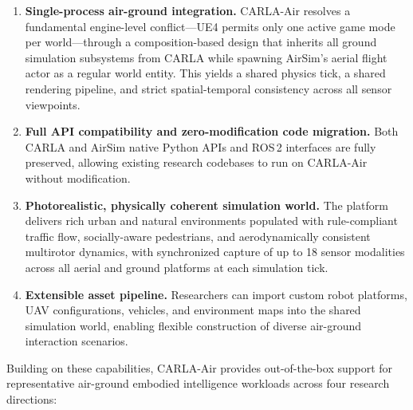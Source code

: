 \begin{enumerate}[leftmargin=*, label=(\roman*)]

\item \textbf{Single-process air-ground integration.}
CARLA-Air resolves a fundamental engine-level conflict---UE4 permits only one
active game mode per world---through a composition-based design that inherits
all ground simulation subsystems from CARLA while spawning AirSim's aerial
flight actor as a regular world entity.
This yields a shared physics tick, a shared rendering pipeline, and strict
spatial-temporal consistency across all sensor viewpoints.

\item \textbf{Full API compatibility and zero-modification code migration.}
Both CARLA and AirSim native Python APIs and ROS\,2 interfaces are fully
preserved, allowing existing research codebases to run on CARLA-Air without
modification.

\item \textbf{Photorealistic, physically coherent simulation world.}
The platform delivers rich urban and natural environments populated with
rule-compliant traffic flow, socially-aware pedestrians, and aerodynamically
consistent multirotor dynamics, with synchronized capture of up to 18 sensor
modalities across all aerial and ground platforms at each simulation tick.

\item \textbf{Extensible asset pipeline.}
Researchers can import custom robot platforms, UAV configurations, vehicles,
and environment maps into the shared simulation world, enabling flexible
construction of diverse air-ground interaction scenarios.

\end{enumerate}

\noindent Building on these capabilities, CARLA-Air provides out-of-the-box
support for representative air-ground embodied intelligence workloads across
four research directions:

